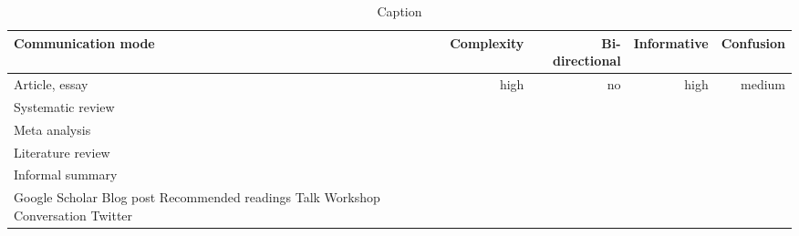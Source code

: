 \begin{table*}\centering
{}
\begin{tabular}{@{}lrrrr@{}}\toprule
Communication mode & Complexity & Bi-directional & Informative  & Confusion
\\\midrule
Article, essay & high & no & high & medium  \\
Systematic review \\
Meta analysis \\
Literature review \\
Informal summary \\
Google Scholar
Blog post
Recommended readings
Talk
Workshop
Conversation
Twitter


\bottomrule
\end{tabular}
\caption{Caption}
\end{table*}